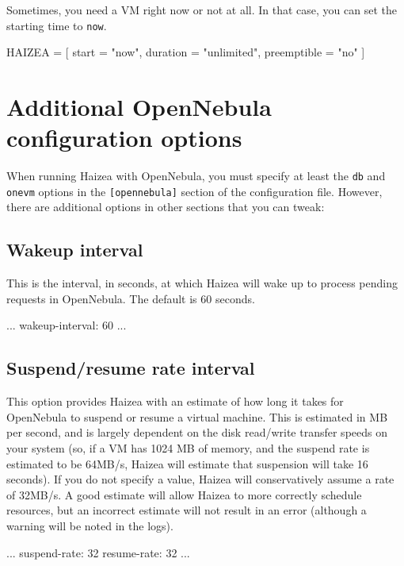 Sometimes, you need a VM right now or not at all. In that case, you can set the starting time to \texttt{now}.

\begin{wideshellverbatim}
HAIZEA = [
  start        = "now",
  duration     = "unlimited",
  preemptible  = "no"
]
\end{wideshellverbatim}

\section{Additional OpenNebula configuration options}

When running Haizea with OpenNebula, you must specify at least the \texttt{db} and \texttt{onevm} options in the \texttt{[opennebula]} section of the configuration file. However, there are additional options in other sections that you can tweak:

\subsection{Wakeup interval}

This is the interval, in seconds, at which Haizea will wake up to process pending requests in OpenNebula. The default is 60 seconds.

\begin{wideshellverbatim}
[scheduling]
...
wakeup-interval: 60
...
\end{wideshellverbatim}

\subsection{Suspend/resume rate interval}

This option provides Haizea with an estimate of how long it takes for OpenNebula to suspend or resume a virtual machine. This is estimated in MB per second, and is largely dependent on the disk read/write transfer speeds on your system (so, if a VM has 1024 MB of memory, and the suspend rate is estimated to be 64MB/s, Haizea will estimate that suspension will take 16 seconds). If you do not specify a value, Haizea will conservatively assume a rate of 32MB/s. A good estimate will allow Haizea to more correctly schedule resources, but an incorrect estimate will not result in an error (although a warning will be noted in the logs).

\begin{wideshellverbatim}
[scheduling]
...
suspend-rate: 32
resume-rate: 32
...
\end{wideshellverbatim}

